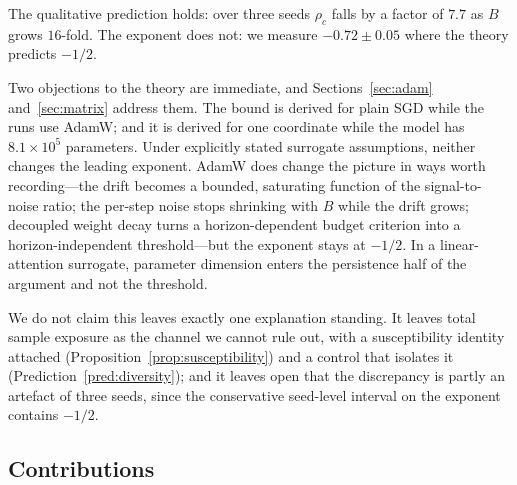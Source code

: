 \documentclass{article}
\theoremstyle{plain}
\theoremstyle{definition}
\theoremstyle{remark}
\newcommand{\1}{\mathbf{1}}
\begin{document}
The qualitative prediction holds: over three seeds $\rho_c$ falls by a factor of
$7.7$ as $B$ grows $16$-fold. The exponent does not: we measure $-0.72\pm0.05$
where the theory predicts $-1/2$.

Two objections to the theory are immediate, and Sections~\ref{sec:adam}
and~\ref{sec:matrix} address them. The bound is derived for plain SGD while the
runs use AdamW; and it is derived for one coordinate while the model has
$8.1\times10^5$ parameters. Under explicitly stated surrogate assumptions,
neither changes the leading exponent. AdamW does change the picture in ways worth
recording---the drift becomes a bounded, saturating function of the
signal-to-noise ratio; the per-step noise stops shrinking with $B$ while the
drift grows; decoupled weight decay turns a horizon-dependent budget criterion
into a horizon-independent threshold---but the exponent stays at $-1/2$. In a
linear-attention surrogate, parameter dimension enters the persistence half of
the argument and not the threshold.

We do not claim this leaves exactly one explanation standing. It leaves total
sample exposure as the channel we cannot rule out, with a susceptibility identity
attached (Proposition~\ref{prop:susceptibility}) and a control that isolates it
(Prediction~\ref{pred:diversity}); and it leaves open that the discrepancy is
partly an artefact of three seeds, since the conservative seed-level interval on
the exponent contains $-1/2$.

\subsection{Contributions}
\end{document}
